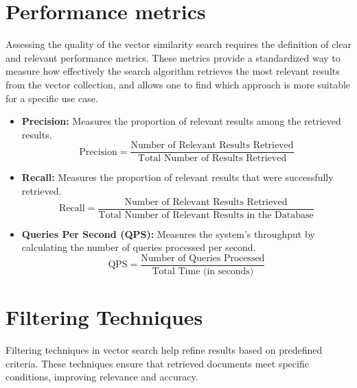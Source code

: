 \section{Performance metrics}
Assessing the quality of the vector similarity search requires the definition of clear and relevant performance metrics. These metrics provide a standardized way to measure how effectively the search algorithm retrieves the most relevant results from the vector collection, and allows one to find which approach is more suitable for a specific use case.
\begin{itemize}
    \item \textbf{Precision:} Measures the proportion of relevant results among the retrieved results.
    \[
    \text{Precision} = \frac{\text{Number of Relevant Results Retrieved}}{\text{Total Number of Results Retrieved}}
    \]

    \item \textbf{Recall:} Measures the proportion of relevant results that were successfully retrieved.
    \[
    \text{Recall} = \frac{\text{Number of Relevant Results Retrieved}}{\text{Total Number of Relevant Results in the Database}}
    \]
    \item \textbf{Queries Per Second (QPS):} Measures the system's throughput by calculating the number of queries processed per second.
    \[
    \text{QPS} = \frac{\text{Number of Queries Processed}}{\text{Total Time (in seconds)}}
    \]
\end{itemize}


\section{Filtering Techniques}
Filtering techniques in vector search help refine results based on predefined criteria. These techniques ensure that retrieved documents meet specific conditions, improving relevance and accuracy.

